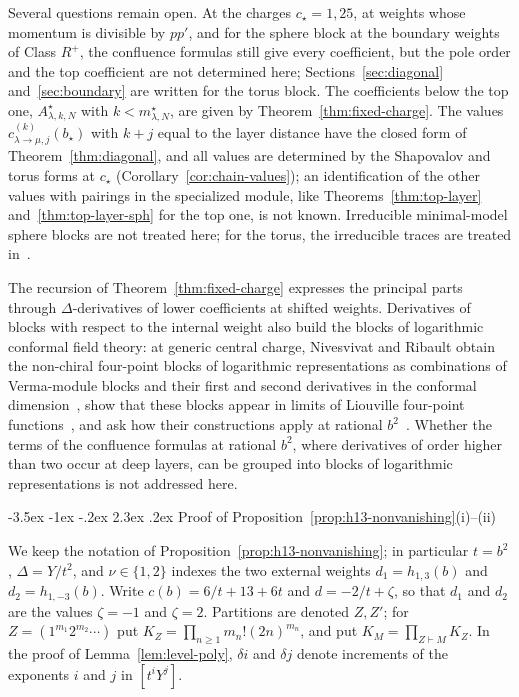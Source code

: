\documentclass[twoside,10pt]{article}
\makeatletter
\numberwithin{equation}{section}
\theoremstyle{slbody}
\theoremstyle{definition}
\theoremstyle{remark}
\renewcommand{\section}{%
  \@startsection{section}{1}{\z@}%
    {-3.5ex \@plus -1ex \@minus -.2ex}%
    {2.3ex \@plus .2ex}%
    {\normalfont\large\bfseries}}
\makeatother
\begin{document}
Several questions remain open.  At the charges \(c_\star=1,25\), at weights
whose momentum is divisible by \(pp'\), and for the sphere block at the
boundary weights of Class \(R^+\), the confluence formulas still give every
coefficient, but the pole order and the top coefficient are not determined
here; Sections~\ref{sec:diagonal} and~\ref{sec:boundary} are written for the
torus block.  The coefficients below the top one, \(A^\star_{\lambda,k,N}\)
with \(k<m^\star_{\lambda,N}\), are given by Theorem~\ref{thm:fixed-charge}.  The
values \(c^{(k)}_{\lambda\to\mu,j}(b_\star)\) with \(k+j\) equal to the layer
distance have the closed form of Theorem~\ref{thm:diagonal}, and all values are
determined by the Shapovalov and torus forms at \(c_\star\)
(Corollary~\ref{cor:chain-values}); an identification of the other values with
pairings in the specialized module, like Theorems~\ref{thm:top-layer}
and~\ref{thm:top-layer-sph} for the top one, is not known.  Irreducible minimal-model sphere
blocks are not treated here; for the torus, the irreducible traces are
treated in~\cite{PolzerTraces2026}.

The recursion of Theorem~\ref{thm:fixed-charge} expresses the principal parts
through \(\Delta\)-derivatives of lower coefficients at shifted weights.
Derivatives of blocks with respect to the internal weight also build the
blocks of logarithmic conformal field theory: at generic central charge,
Nivesvivat and Ribault obtain the non-chiral four-point blocks of logarithmic
representations as combinations of Verma-module blocks and their first and
second derivatives in the conformal
dimension~\cite[\S2 and \S3.2]{NivesvivatRibault2021}, show that these blocks
appear in limits of Liouville four-point
functions~\cite[\S3.3]{NivesvivatRibault2021}, and ask how their constructions
apply at rational \(b^2\)~\cite[\S6]{NivesvivatRibault2021}.  Whether the
terms of the confluence formulas at rational \(b^2\), where derivatives of
order higher than two occur at deep layers, can be grouped into blocks of
logarithmic representations is not addressed here.

\appendix
\section{Proof of Proposition~\ref{prop:h13-nonvanishing}(i)--(ii)}\label{app:h13}

We keep the notation of Proposition~\ref{prop:h13-nonvanishing}; in
particular \(t=b^2\), \(\Delta=Y/t^2\), and \(\nu\in\{1,2\}\) indexes the two
external weights \(d_1=h_{1,3}(b)\) and \(d_2=h_{1,-3}(b)\).  Write
\(c(b)=6/t+13+6t\) and \(d=-2/t+\zeta\), so that \(d_1\) and \(d_2\) are the
values \(\zeta=-1\) and \(\zeta=2\).  Partitions are denoted \(Z,Z'\); for
\(Z=(1^{m_1}2^{m_2}\cdots)\) put \(K_Z=\prod_{n\geq1}m_n!(2n)^{m_n}\), and put
\(K_M=\prod_{Z\vdash M}K_Z\).  In the proof of Lemma~\ref{lem:level-poly},
\(\delta i\) and \(\delta j\) denote increments of the exponents \(i\) and
\(j\) in \([t^iY^j]\).
\end{document}
